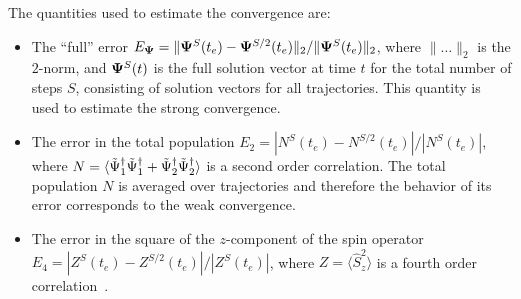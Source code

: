 The quantities used to estimate the convergence are:
\begin{itemize}
\item The ``full'' error $E_{\mathbf{\Psi}} = \| \mathbf{\Psi}^{S}(t_e) - \mathbf{\Psi}^{S / 2}(t_e) \|_2 / \| \mathbf{\Psi}^{S}(t_e) \|_2$, where $\|\ldots\|_2$ is the $2$-norm, and $\mathbf{\Psi}^{S}(t)$ is the full solution vector at time $t$ for the total number of steps $S$, consisting of solution vectors for all trajectories.
    This quantity is used to estimate the strong convergence.
\item The error in the total population $E_2 = |N^{S}(t_e) - N^{S / 2}(t_e)| / |N^{S}(t_e)|$, where $N = \langle \tilde{\Psi}_1^\dagger \tilde{\Psi}_1^\dagger + \tilde{\Psi}_2^\dagger \tilde{\Psi}_2^\dagger \rangle$ is a second order correlation.
    The total population $N$ is averaged over trajectories and therefore the behavior of its error corresponds to the weak convergence.
\item The error in the square of the $z$-component of the spin operator $E_4 = |Z^{S}(t_e) - Z^{S / 2}(t_e)| / |Z^{S}(t_e)|$, where $Z = \langle \hat{S}^2_z \rangle$ is a fourth order correlation~.
\end{itemize}

